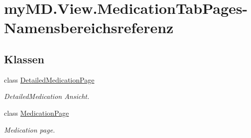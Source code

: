 \hypertarget{namespacemy_m_d_1_1_view_1_1_medication_tab_pages}{}\section{my\+M\+D.\+View.\+Medication\+Tab\+Pages-\/\+Namensbereichsreferenz}
\label{namespacemy_m_d_1_1_view_1_1_medication_tab_pages}
\subsection*{Klassen}
\begin{DoxyCompactItemize}
\item 
class \mbox{\hyperlink{classmy_m_d_1_1_view_1_1_medication_tab_pages_1_1_detailed_medication_page}{Detailed\+Medication\+Page}}
\begin{DoxyCompactList}\small\item\em Detailed\+Medication Ansicht. \end{DoxyCompactList}\item 
class \mbox{\hyperlink{classmy_m_d_1_1_view_1_1_medication_tab_pages_1_1_medication_page}{Medication\+Page}}
\begin{DoxyCompactList}\small\item\em Medication page. \end{DoxyCompactList}\end{DoxyCompactItemize}
